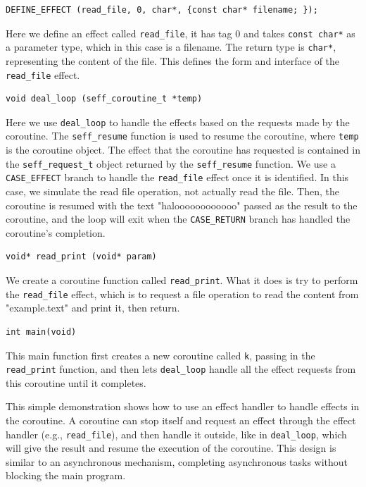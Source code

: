 \documentclass{article}
\begin{document}
\begin{lstlisting}
DEFINE_EFFECT (read_file, 0, char*, {const char* filename; });
\end{lstlisting}

Here we define an effect called \texttt{read\_file}, it has tag 0 and takes \texttt{const char*} as a parameter type, which in this case is a filename. The return type is \texttt{char*}, representing the content of the file. This defines the form and interface of the \texttt{read\_file} effect.

\begin{lstlisting}
void deal_loop (seff_coroutine_t *temp)
\end{lstlisting}

Here we use \texttt{deal\_loop} to handle the effects based on the requests made by the coroutine. The \texttt{seff\_resume} function is used to resume the coroutine, where \texttt{temp} is the coroutine object. The effect that the coroutine has requested is contained in the \texttt{seff\_request\_t} object returned by the \texttt{seff\_resume} function. We use a \texttt{CASE\_EFFECT} branch to handle the \texttt{read\_file} effect once it is identified. In this case, we simulate the read file operation, not actually read the file. Then, the coroutine is resumed with the text "haloooooooooooo" passed as the result to the coroutine, and the loop will exit when the \texttt{CASE\_RETURN} branch has handled the coroutine's completion.

\begin{lstlisting}
void* read_print (void* param)
\end{lstlisting}

We create a coroutine function called \texttt{read\_print}. What it does is try to perform the \texttt{read\_file} effect, which is to request a file operation to read the content from "example.text" and print it, then return.

\begin{lstlisting}
int main(void)
\end{lstlisting}

This main function first creates a new coroutine called \texttt{k}, passing in the \texttt{read\_print} function, and then lets \texttt{deal\_loop} handle all the effect requests from this coroutine until it completes.

\medskip




This simple demonstration shows how to use an effect handler to handle effects in the coroutine. A coroutine can stop itself and request an effect through the effect handler (e.g., \texttt{read\_file}), and then handle it outside, like in \texttt{deal\_loop}, which will give the result and resume the execution of the coroutine. This design is similar to an asynchronous mechanism, completing asynchronous tasks without blocking the main program.
\end{document}
